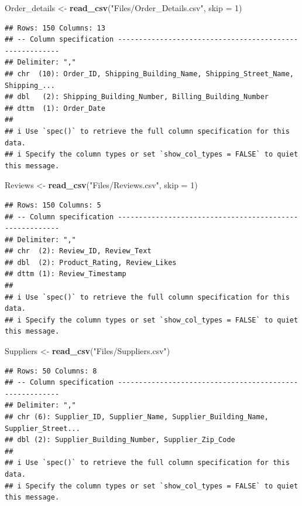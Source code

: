 \documentclass[
]{article}
\newenvironment{Shaded}{\begin{snugshade}}{\end{snugshade}}
\newcommand{\AttributeTok}[1]{\textcolor[rgb]{0.13,0.29,0.53}{#1}}
\newcommand{\DecValTok}[1]{\textcolor[rgb]{0.00,0.00,0.81}{#1}}
\newcommand{\FunctionTok}[1]{\textcolor[rgb]{0.13,0.29,0.53}{\textbf{#1}}}
\newcommand{\NormalTok}[1]{#1}
\newcommand{\OtherTok}[1]{\textcolor[rgb]{0.56,0.35,0.01}{#1}}
\newcommand{\StringTok}[1]{\textcolor[rgb]{0.31,0.60,0.02}{#1}}
\begin{document}
\begin{Shaded}
\begin{Highlighting}[]
\NormalTok{Order\_details }\OtherTok{\textless{}{-}} \FunctionTok{read\_csv}\NormalTok{(}\StringTok{"Files/Order\_Details.csv"}\NormalTok{,}
    \AttributeTok{skip =} \DecValTok{1}\NormalTok{)}
\end{Highlighting}
\end{Shaded}

\begin{verbatim}
## Rows: 150 Columns: 13
## -- Column specification --------------------------------------------------------
## Delimiter: ","
## chr  (10): Order_ID, Shipping_Building_Name, Shipping_Street_Name, Shipping_...
## dbl   (2): Shipping_Building_Number, Billing_Building_Number
## dttm  (1): Order_Date
## 
## i Use `spec()` to retrieve the full column specification for this data.
## i Specify the column types or set `show_col_types = FALSE` to quiet this message.
\end{verbatim}

\begin{Shaded}
\begin{Highlighting}[]
\NormalTok{Reviews }\OtherTok{\textless{}{-}} \FunctionTok{read\_csv}\NormalTok{(}\StringTok{"Files/Reviews.csv"}\NormalTok{,}
    \AttributeTok{skip =} \DecValTok{1}\NormalTok{)}
\end{Highlighting}
\end{Shaded}

\begin{verbatim}
## Rows: 150 Columns: 5
## -- Column specification --------------------------------------------------------
## Delimiter: ","
## chr  (2): Review_ID, Review_Text
## dbl  (2): Product_Rating, Review_Likes
## dttm (1): Review_Timestamp
## 
## i Use `spec()` to retrieve the full column specification for this data.
## i Specify the column types or set `show_col_types = FALSE` to quiet this message.
\end{verbatim}

\begin{Shaded}
\begin{Highlighting}[]
\NormalTok{Suppliers }\OtherTok{\textless{}{-}} \FunctionTok{read\_csv}\NormalTok{(}\StringTok{"Files/Suppliers.csv"}\NormalTok{)}
\end{Highlighting}
\end{Shaded}

\begin{verbatim}
## Rows: 50 Columns: 8
## -- Column specification --------------------------------------------------------
## Delimiter: ","
## chr (6): Supplier_ID, Supplier_Name, Supplier_Building_Name, Supplier_Street...
## dbl (2): Supplier_Building_Number, Supplier_Zip_Code
## 
## i Use `spec()` to retrieve the full column specification for this data.
## i Specify the column types or set `show_col_types = FALSE` to quiet this message.
\end{verbatim}
\end{document}
